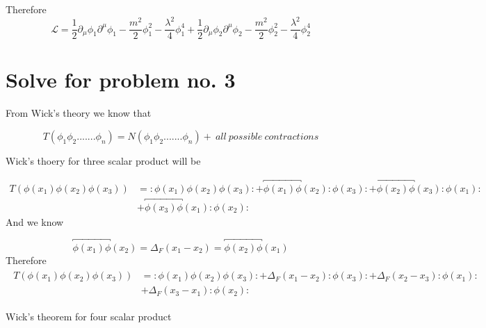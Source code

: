 \documentclass[12pt, letterpaper]{article}
\newcommand*{\1}{\hspace{1pt}}
\begin{document}
Therefore 
\begin{equation}
    \mathcal{L} = \frac{1}{2}\partial _{\mu}\phi _{1}\partial ^{\mu}\phi _{1} - \frac{m^{2}}{2} \phi _{1} ^{2} - \frac{\lambda ^{2}}{4} \phi _{1} ^{4} + \frac{1}{2}\partial _{\mu}\phi _{2}\partial ^{\mu}\phi _{2} - \frac{m^{2}}{2} \phi _{2} ^{2}  - \frac{\lambda ^{2}}{4} \phi _{2} ^{4}
\end{equation}

\section*{Solve for problem no. 3}
From Wick's theory we know that

\begin{equation}
    T(\phi _{1} \phi _{2} ....... \phi _{n}) = N(\phi _{1} \phi _{2} ....... \phi _{n}) + \ all \ possible \ contractions  
\end{equation}

Wick's thoery for three scalar product will be

\begin{align*}
    T(\phi (x_{1})\phi (x_{2})\phi (x_{3})) &= :\phi (x_{1})\phi (x_{2})\phi (x_{3}): + \overbracket{\phi (x_{1})\phi} (x_{2}):\phi (x_{3}): + \overbracket{\phi (x_{2})\phi} (x_{3}):\phi (x_{1}): \\ 
    & + \overbracket{\phi (x_{3})\phi} (x_{1}):\phi (x_{2}):
\end{align*}
And we know 

\begin{equation}
    \overbracket{\phi (x_{1})\phi} (x_{2}) = \Delta _{F} (x_{1} - x_{2}) = \overbracket{\phi (x_{2})\phi} (x_{1})
\end{equation}
Therefore 
\begin{align}
\begin{split}
    T(\phi (x_{1})\phi (x_{2})\phi (x_{3})) &= :\phi (x_{1})\phi (x_{2})\phi (x_{3}): + \Delta _{F} (x_{1} - x_{2}):\phi (x_{3}): + \Delta _{F} (x_{2} - x_{3}):\phi (x_{1}): \\ 
    & + \Delta _{F} (x_{3} - x_{1}):\phi (x_{2}):
\end{split}
\end{align}

Wick's theorem for four scalar product
\end{document}
